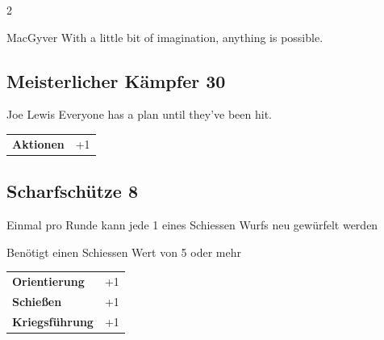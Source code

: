 \begin{multicols}{2}
\begin{tcolorbox}
\begin{pquote}{MacGyver}
With a little bit of imagination, anything is possible.
\end{pquote}

\vspace{3mm}



\end{tcolorbox}

\begin{tcolorbox}
    \subsection*{Meisterlicher Kämpfer \hfill \small{30 }}
    \tcblower


\begin{pquote}{Joe Lewis}
Everyone has a plan until they’ve been hit.
\end{pquote}

\vspace{3mm}

\begin{tabular}{@{}ll@{}}
    \textbf{Aktionen} & +1\\
\end{tabular}


\end{tcolorbox}

\begin{tcolorbox}
    \subsection*{Scharfschütze \hfill \small{8 }}
    \tcblower
Einmal pro Runde kann jede 1 eines Schiessen Wurfs neu gewürfelt werden

Benötigt einen Schiessen Wert von 5 oder mehr


\vspace{3mm}

\begin{tabular}{@{}ll@{}}
    \textbf{Orientierung} & +1\\
    \textbf{Schießen} & +1\\
    \textbf{Kriegsführung} & +1\\
\end{tabular}


\end{tcolorbox}
\end{multicols}
